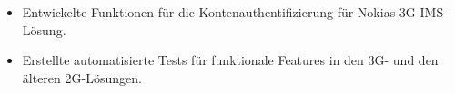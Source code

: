 \begin{minipage}{\linewidth}
\begin{itemize}
  \item Entwickelte Funktionen für die Kontenauthentifizierung für Nokias 3G IMS-Lösung.
  \item Erstellte automatisierte Tests für funktionale Features in den 3G- und den älteren 2G-Lösungen.
\end{itemize}
\end{minipage}
\divider
